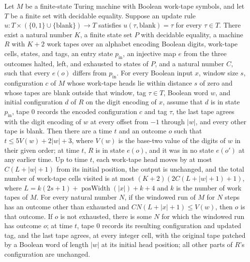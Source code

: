 \begin{theorem}
\label{Turing.exists_windowRunnerTM}
\leanok
{}
Let $M$ be a finite-state Turing machine with Boolean work-tape symbols, and let $T$ be
a finite set with decidable equality. Suppose an update rule
$u:T\times(\{0,1\}\cup\{\mathrm{blank}\})\to T$ satisfies $u(\tau,\mathrm{blank})=\tau$
for every $\tau\in T$. There exist a natural number $K$, a finite state set $P$ with
decidable equality, a machine $R$ with $K+2$ work tapes over an alphabet encoding
Boolean digits, work-tape cells, states, and tags, an entry state $p_{\mathrm{in}}$, an
injective map $e$ from the three outcomes halted, left, and exhausted to states of $P$,
and a natural number $C$, such that every $e(o)$ differs from $p_{\mathrm{in}}$. For
every Boolean input $x$, window size $s$, configuration $c$ of $M$ whose work-tape heads
lie within distance $s$ of zero and whose tapes are blank outside that window, tag
$\tau\in T$, Boolean word $w$, and initial configuration $d$ of $R$ on the digit
encoding of $x$, assume that $d$ is in state $p_{\mathrm{in}}$, tape 0 records the
encoded configuration $c$ and tag $\tau$, the last tape agrees with the digit encoding
of $w$ at every offset from $-1$ through $|w|$, and every other tape is blank. Then
there are a time $t$ and an outcome $o$ such that $t\le 5V(w)+2|w|+3$, where $V(w)$ is
the base-two value of the digits of $w$ in their given order; at time $t$, $R$ is in
state $e(o)$, and it was in no state $e(o')$ at any earlier time. Up to time $t$, each
work-tape head moves by at most $C(L+|w|+1)$ from its initial position, the output is
unchanged, and the total number of work-tape cells visited is at most
$(K+2)(2C(L+|w|+1)+1)$, where $L=k(2s+1)+\operatorname{posWidth}(|x|)+k+4$ and $k$ is
the number of work tapes of $M$. For every natural number $N$, if the windowed run of
$M$ for $N$ steps has an outcome other than exhausted and $CN(L+|x|+1)\le V(w)$, then
$o$ is that outcome. If $o$ is not exhausted, there is some $N$ for which the windowed
run has outcome $o$; at time $t$, tape 0 records its resulting configuration and updated
tag, and the last tape agrees, at every integer cell, with the original tape patched by
a Boolean word of length $|w|$ at its initial head position; all other parts of $R$'s
configuration are unchanged.
\end{theorem}
